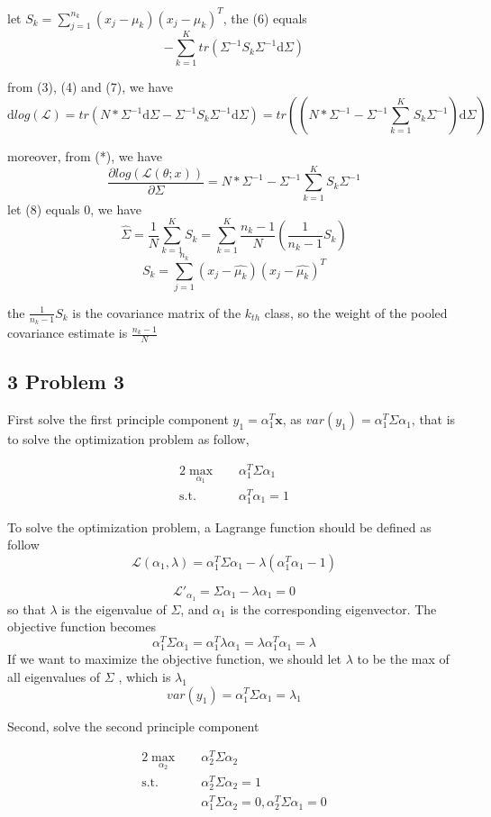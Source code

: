 \documentclass[10pt,a4paper]{article}
\begin{document}
let $S_k=\sum_{j=1}^{n_k}(x_j-\mu_{k})(x_j-\mu_{k})^T$, the (6) equals 
\[ 
-\sum_{k=1}^{K}tr(\Sigma^{-1}S_k\Sigma^{-1}\mathrm{d}\Sigma)
\tag{7}
 \]

from (3), (4) and (7), we have
\[ \mathrm{d}log(\mathcal{L})=tr(N*\Sigma^{-1}\mathrm{d}\Sigma-\Sigma^{-1}S_k\Sigma^{-1}\mathrm{d}\Sigma)=tr((N*\Sigma^{-1}-\Sigma^{-1}\sum_{k=1}^{K}S_k\Sigma^{-1})\mathrm{d}\Sigma) \]

moreover, from (*), we have
\[ \frac{\partial log(\mathcal{L}(\theta;x))}{\partial \Sigma}=N*\Sigma^{-1}-\Sigma^{-1}\sum_{k=1}^{K}S_k\Sigma^{-1}
\tag{8} \]
let (8) equals 0, we have
\[ \hat{\Sigma}=\frac{1}{N}\sum_{k=1}^{K}S_k=\sum_{k=1}^{K}\frac{n_k-1}{N}(\frac{1}{n_k-1}S_k)  \]
\[ S_k=\sum_{j=1}^{n_k}(x_j-\hat{\mu_{k}})(x_j-\hat{\mu_{k}})^T \]

the $ \frac{1}{n_k-1}S_k $ is the covariance matrix of the $k_{th}$ class, so the weight of the pooled covariance estimate is $\frac{n_k-1}{N}$


\subsection{3 Problem 3}
First solve the first principle component $ y_1=\alpha_1^T\mathbf{x} $, as $ var(y_1)=\alpha_1^T \Sigma \alpha_1 $, that is to solve the optimization problem as follow,

\begin{alignat*}{2}
	\max_{\alpha_1} \quad & \alpha_1^T \Sigma \alpha_1 \\
	\mbox{s.t.}\quad
	&\alpha_1^T\alpha_1 = 1 
\end{alignat*}

To solve the optimization problem, a Lagrange function should be defined as follow
\[ \mathcal{L}(\alpha_1, \lambda)= \alpha_1^T \Sigma \alpha_1 - \lambda(\alpha_1^T\alpha_1 - 1 ) \]

\[ \mathcal{L}'_{\alpha_1}= \Sigma \alpha_1 - \lambda \alpha_1=0 \]
so that $\lambda$ is the eigenvalue of $\Sigma$, and $\alpha_1$ is the corresponding eigenvector. The objective function becomes
\[ \alpha_1^T \Sigma \alpha_1=\alpha_1^T \lambda \alpha_1=\lambda \alpha_1^T  \alpha_1=\lambda \]
If we want to maximize the objective function, we should let $\lambda$ to be the max of all eigenvalues of $\Sigma$ , which is $\lambda_1$
\[ var(y_1)=\alpha_1^T \Sigma \alpha_1=\lambda_1 \]

Second, solve the second principle component 

\begin{alignat*}{2}
	\max_{\alpha_2} \quad & \alpha_2^T \Sigma \alpha_2 \\
	\mbox{s.t.}\quad
	&\alpha_2^T\Sigma\alpha_2 = 1 \\
	&\alpha_1^T\Sigma\alpha_2 = 0,  \alpha_2^T\Sigma\alpha_1 = 0
\end{alignat*}
\end{document}
